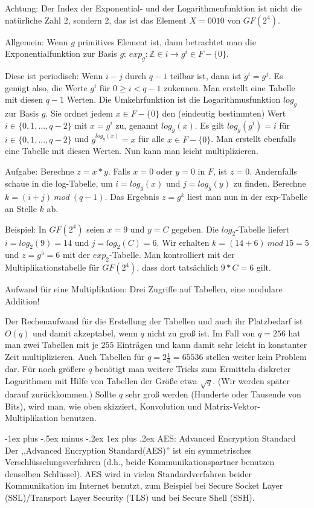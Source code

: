 \documentclass[a4paper]{article}
\makeatletter
\renewcommand{\subsubsection}{\@startsection{subsubsection}{3}{0mm}%
 {-1ex plus -.5ex minus -.2ex}%
 {1ex plus .2ex}%
 {\normalfont\small\bfseries}}
\makeatother
\begin{document}
\begin{multicols}{3}
    Achtung: Der Index der Exponential- und der Logarithmenfunktion ist nicht die natürliche Zahl 2, sondern 2, das ist das Element $X=0010$ von $GF(2^4)$.

    Allgemein: Wenn $g$ primitives Element ist, dann betrachtet man die Exponentialfunktion zur Basis $g$: $exp_g:\mathbb{Z}\in i\rightarrow g^i\in F-\{0\}$.

    Diese ist periodisch: Wenn $i-j$ durch $q-1$ teilbar ist, dann ist $g^i=g^j$. Es genügt also, die Werte $g^i$ für $0\geq i<q-1$ zukennen. Man erstellt eine Tabelle mit diesen $q-1$ Werten.
    Die Umkehrfunktion ist die Logarithmusfunktion $log_g$ zur Basis $g$. Sie ordnet jedem $x\in F-\{0\}$ den (eindeutig bestimmten) Wert $i\in\{0,1,...,q-2\}$ mit $x=g^i$ zu, genannt $log_g(x)$. Es gilt $log_g(g^i)=i$ für $i\in\{0,1,...,q-2\}$ und $g^{log_g(x)}=x$ für alle $x\in F-\{0\}$. Man erstellt ebenfalls eine Tabelle mit diesen Werten.
    Nun kann man leicht multiplizieren.

    Aufgabe: Berechne $z=x*y$.
    Falls $x=0$ oder $y=0$ in $F$, ist $z=0$. Andernfalls schaue in die log-Tabelle, um $i=log_g(x)$ und $j=log_g(y)$ zu finden. Berechne $k=(i+j)\ mod\ (q-1)$. Das Ergebnis $z=g^k$ liest man nun in der exp-Tabelle an Stelle $k$ ab.

    Beispiel: In $GF(2^4)$ seien $x=9$ und $y=C$ gegeben. Die $log_2$-Tabelle liefert $i=log_2(9)=14$ und $j=log_2(C)=6$. Wir erhalten $k= (14+6)\ mod\ 15 = 5$ und $z=g^5=6$ mit der $exp_2$-Tabelle. Man kontrolliert mit der Multiplikationstabelle für $GF(2^4)$, dass dort tatsächlich $9*C=6$ gilt.

    Aufwand für eine Multiplikation: Drei Zugriffe auf Tabellen, eine modulare Addition!

    Der Rechenaufwand für die Erstellung der Tabellen und auch ihr Platzbedarf ist $O(q)$ und damit akzeptabel, wenn $q$ nicht zu groß ist. Im Fall von $q=256$ hat man zwei Tabellen mit je $255$ Einträgen und kann damit sehr leicht in konstanter Zeit multiplizieren. Auch Tabellen für $q=2\frac{1}{6}=65536$ stellen weiter kein Problem dar. Für noch größere $q$ benötigt man weitere Tricks zum Ermitteln diskreter Logarithmen mit Hilfe von Tabellen der Größe etwa $\sqrt{q}$. (Wir werden später darauf zurückkommen.) Sollte $q$ sehr groß werden (Hunderte oder Tausende von Bits), wird man, wie oben skizziert, Konvolution und Matrix-Vektor-Multiplikation benutzen.

    \subsubsection{AES: Advanced Encryption Standard}
    Der ,,Advanced Encryption Standard(AES)'' ist ein symmetrisches Verschlüsselungsverfahren (d.h., beide Kommunikationspartner benutzen denselben Schlüssel). AES wird in vielen Standardverfahren beider Kommunikation im Internet benutzt, zum Beispiel bei Secure Socket Layer (SSL)/Transport Layer Security (TLS) und bei Secure Shell (SSH).


\end{multicols}
\end{document}
